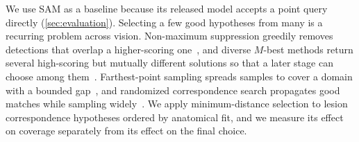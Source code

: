 We use SAM as a baseline because its released model accepts a point query directly (\cref{sec:evaluation}). Selecting a few good hypotheses from many is a recurring problem across vision.
Non-maximum suppression greedily removes detections that overlap a higher-scoring one~\cite{neubeck2006nms}, and diverse $M$-best methods return several high-scoring but mutually different solutions so that a later stage can choose among them~\cite{batra2012diverse}.
Farthest-point sampling spreads samples to cover a domain with a bounded gap~\cite{eldar1997farthest}, and randomized correspondence search propagates good matches while sampling widely~\cite{barnes2009patchmatch}.
We apply minimum-distance selection to lesion correspondence hypotheses ordered by anatomical fit, and we measure its effect on coverage separately from its effect on the final choice.
